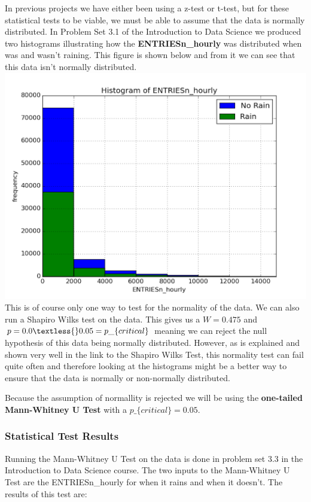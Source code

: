 \documentclass{article}
\begin{document}
In previous projects we have either been using a z-test or t-test, but
for these statistical tests to be viable, we must be able to assume that
the data is normally distributed. In Problem Set 3.1 of the Introduction
to Data Science we produced two histograms illustrating how the
\textbf{ENTRIESn\_hourly} was distributed when was and wasn't raining.
This figure is shown below and from it we can see that this data isn't
normally distributed.
\includegraphics{ENTRIESn_hourly_distribution_3_1.png} This is of course
only one way to test for the normality of the data. We can also run a
Shapiro Wilks test on the data. This gives us a $ W = 0.475 $ and $ p
= 0.0 \textless{} 0.05 = p\_\{critical\} $ meaning we can reject the
null hypothesis of this data being normally distributed. However, as is
explained and shown very well in the link to the Shapiro Wilks Test,
this normality test can fail quite often and therefore looking at the
histograms might be a better way to ensure that the data is normally or
non-normally distributed.

Because the assumption of normallity is rejected we will be using the
\textbf{one-tailed Mann-Whitney U Test} with a $ p\_\{critical\} = 0.05
$.

\subsubsection{Statistical Test Results}\label{statistical-test-results}

Running the Mann-Whitney U Test on the data is done in problem set 3.3
in the Introduction to Data Science course. The two inputs to the
Mann-Whitney U Test are the ENTRIESn\_hourly for when it rains and when
it doesn't. The results of this test are:
\end{document}
